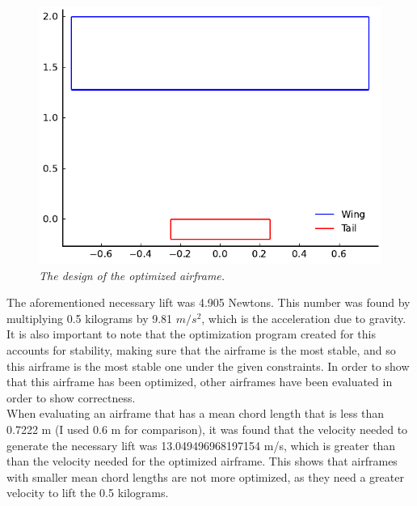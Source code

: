 \documentclass{journal}
\begin{document}
	\begin{figure}[H]
		\includegraphics{../graphics/ideal_design.pdf}
		\caption{\emph{The design of the optimized airframe.}}
		\label{fig:ideal_design}
	\end{figure}
	
	The aforementioned necessary lift was 4.905 Newtons. This number was found by multiplying 0.5 kilograms by 9.81 \(m/s^2\), which is the acceleration due to gravity. It is also important to note that the optimization program created for this accounts for stability, making sure that the airframe is the most stable, and so this airframe is the most stable one under the given constraints. In order to show that this airframe has been optimized, other airframes have been evaluated in order to show correctness.\\
	
	When evaluating an airframe that has a mean chord length that is less than 0.7222 m (I used 0.6 m for comparison), it was found that the velocity needed to generate the necessary lift was 13.049496968197154 m/s, which is greater than than the velocity needed for the optimized airframe. This shows that airframes with smaller mean chord lengths are not more optimized, as they need a greater velocity to lift the 0.5 kilograms.\\
	
\end{document}
